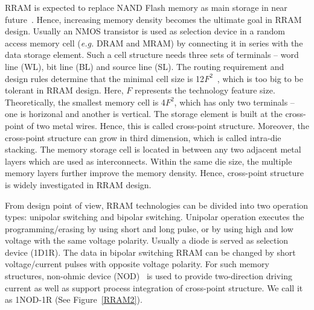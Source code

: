 RRAM is expected to replace NAND Flash memory as main storage in near future~\cite{ITRS07}. Hence, increasing memory density becomes the ultimate goal in RRAM design. Usually an NMOS transistor is used as selection device in a random access memory cell (\emph{e.g.} DRAM and MRAM) by connecting it in series with the data storage element. Such a cell structure needs three sets of terminals -- word line (WL), bit line (BL) and source line (SL). The routing requirement and design rules determine that the minimal cell size is 12$F^2$~\cite{Li09}, which is too big to be tolerant in RRAM design. Here, $F$ represents the technology feature size. Theoretically, the smallest memory cell is 4$F^2$, which has only two terminals -- one is horizonal and another is vertical. The storage element is built at the cross-point of two metal wires. Hence, this is called cross-point structure. %
Moreover, the cross-point structure can grow in third dimension, which is called intra-die stacking. %
The memory storage cell is located in between any two adjacent metal layers which are used as interconnects. Within the same die size, the multiple memory layers further improve the memory density. Hence, cross-point structure is widely investigated in RRAM design.

From design point of view, RRAM technologies can be divided into two operation types: unipolar switching and bipolar switching. Unipolar operation executes the programming/erasing by using short and long pulse, or by using high and low voltage with the same voltage polarity. Usually a diode is served as selection device (1D1R). The data in bipolar switching RRAM can be changed by short voltage/current pulses with opposite voltage polarity. For such memory structures, non-ohmic device (NOD)~\cite{Yan4430255} is used to provide two-direction driving current as well as support process integration of cross-point structure. We call it as 1NOD-1R (See Figure~\ref{RRAM2}).

